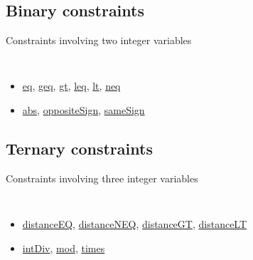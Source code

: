 \subsection{Binary constraints}\label{model:comparisonconstraints}\hypertarget{model:comparisonconstraints}{}
Constraints involving two integer variables
\begin{notedef}\tt
  \begin{itemize}
  \item \hyperlink{eq:eqconstraint}{eq}, \hyperlink{geq:geqconstraint}{geq}, \hyperlink{gt:gtconstraint}{gt}, \hyperlink{leq:leqconstraint}{leq}, \hyperlink{lt:ltconstraint}{lt}, \hyperlink{neq:neqconstraint}{neq}
  \item \hyperlink{abs:absconstraint}{abs}, \hyperlink{oppositesign:oppositesignconstraint}{oppositeSign}, \hyperlink{samesign:samesignconstraint}{sameSign}
  \end{itemize}
\end{notedef}


\subsection{Ternary constraints}\label{model:ternaryconstraints}\hypertarget{model:ternaryconstraints}{}
Constraints involving three integer variables
\begin{notedef}\tt
  \begin{itemize}
  \item \hyperlink{distanceeq:distanceeqconstraint}{distanceEQ}, \hyperlink{distanceneq:distanceneqconstraint}{distanceNEQ}, \hyperlink{distancegt:distancegtconstraint}{distanceGT}, \hyperlink{distancelt:distanceltconstraint}{distanceLT}
  \item \hyperlink{intdiv:intdivconstraint}{intDiv}, \hyperlink{mod:modconstraint}{mod}, \hyperlink{times:timesconstraint}{times}
  \end{itemize}
\end{notedef}

